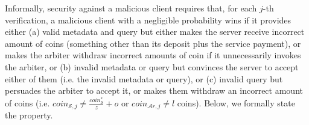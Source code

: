  
 
 
 
Informally, security against a malicious client requires that, for each  $j$-th verification, a malicious client with a negligible probability  wins if it provides either (a) valid metadata and query but either makes the server receive incorrect amount of coins (something other than its deposit plus the service payment), or makes the arbiter withdraw incorrect amounts of coin if it unnecessarily invokes the arbiter,  or (b) invalid metadata or query but convinces the server to accept either of them (i.e. the invalid metadata or query), or (c) invalid query but persuades the arbiter to accept it, or  makes them withdraw an incorrect amount of coins (i.e. $coin_{\scriptscriptstyle\mathcal{S},j}\neq \frac{coin_{\scriptscriptstyle\mathcal S}^{\scriptscriptstyle*}}{z}+o$ or  $coin_{\scriptscriptstyle\mathcal{A}r,j}\neq l$ coins). Below, we formally state the property. 
 
 
